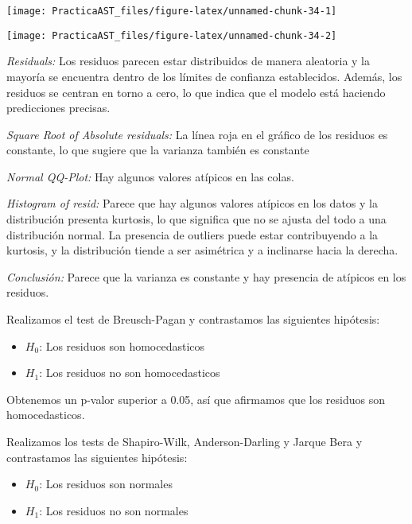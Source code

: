 \documentclass[
]{article}
\providecommand{\tightlist}{%
  \setlength{\itemsep}{0pt}\setlength{\parskip}{0pt}}
\begin{document}
\begin{center}\texttt{[image: PracticaAST\_files/figure-latex/unnamed-chunk-34-1]} \end{center}

\begin{center}\texttt{[image: PracticaAST\_files/figure-latex/unnamed-chunk-34-2]} \end{center}

\emph{Residuals:} Los residuos parecen estar distribuidos de manera
aleatoria y la mayoría se encuentra dentro de los límites de confianza
establecidos. Además, los residuos se centran en torno a cero, lo que
indica que el modelo está haciendo predicciones precisas.

\emph{Square Root of Absolute residuals:} La línea roja en el gráfico de
los residuos es constante, lo que sugiere que la varianza también es
constante

\emph{Normal QQ-Plot:} Hay algunos valores atípicos en las colas.

\emph{Histogram of resid:} Parece que hay algunos valores atípicos en
los datos y la distribución presenta kurtosis, lo que significa que no
se ajusta del todo a una distribución normal. La presencia de outliers
puede estar contribuyendo a la kurtosis, y la distribución tiende a ser
asimétrica y a inclinarse hacia la derecha.

\emph{Conclusión:} Parece que la varianza es constante y hay presencia
de atípicos en los residuos.

\medskip

Realizamos el test de Breusch-Pagan y contrastamos las siguientes
hipótesis:

\begin{itemize}
\tightlist
\item
  \(H_0\): Los residuos son homocedasticos
\item
  \(H_1\): Los residuos no son homocedasticos
\end{itemize}

Obtenemos un p-valor superior a 0.05, así que afirmamos que los residuos
son homocedasticos.

\medskip

Realizamos los tests de Shapiro-Wilk, Anderson-Darling y Jarque Bera y
contrastamos las siguientes hipótesis:

\begin{itemize}
\tightlist
\item
  \(H_0\): Los residuos son normales
\item
  \(H_1\): Los residuos no son normales
\end{itemize}
\end{document}
